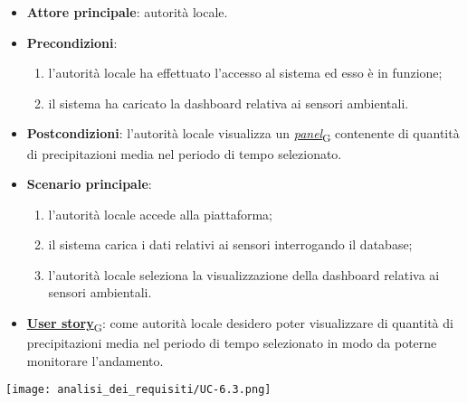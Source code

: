 \begin{itemize}
	\item \textbf{Attore principale}: autorità locale.
	\item \textbf{Precondizioni}:
	      \begin{enumerate}
		      \item l'autorità locale ha effettuato l'accesso al sistema ed esso è in funzione;
		      \item il sistema ha caricato la dashboard relativa ai sensori ambientali.
	      \end{enumerate}
	\item \textbf{Postcondizioni}: l'autorità locale visualizza un \href{https://7last.github.io/docs/pb/documentazione-interna/glossario\#panel}{\textit{panel}\textsubscript{G}} contenente di quantità di precipitazioni media nel periodo di tempo selezionato.
	\item \textbf{Scenario principale}:
	      \begin{enumerate}
		      \item l'autorità locale accede alla piattaforma;
		      \item il sistema carica i dati relativi ai sensori interrogando il database;
		      \item l'autorità locale seleziona la visualizzazione della dashboard relativa ai sensori ambientali.
	      \end{enumerate}
	\item \href{https://7last.github.io/docs/pb/documentazione-interna/glossario\#user-story}{\textbf{User story}\textsubscript{G}}: come autorità locale desidero poter visualizzare di quantità di precipitazioni media nel periodo di tempo selezionato
	      in modo da poterne monitorare l'andamento.
\end{itemize}
\begin{center}
	\texttt{[image: analisi\_dei\_requisiti/UC-6.3.png]}
\end{center}


